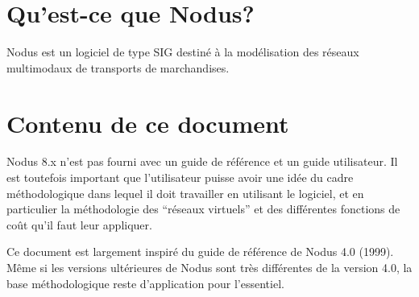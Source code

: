 
\section{Qu'est-ce que Nodus?}

Nodus est un logiciel de type SIG destiné à la modélisation des réseaux
multi\-modaux de transports de marchandises.

\section{Contenu de ce document}

Nodus 8.x n'est pas fourni avec un guide de référence et un guide
utilisateur.  Il est toutefois important que l'utilisateur puisse avoir une idée
du cadre méthodologique dans lequel il doit travailler en utilisant le logiciel,
et en particulier la méthodologie des ``réseaux virtuels'' et des différentes
fonctions de coût qu'il faut leur appliquer.

Ce document est largement inspiré du guide de référence de Nodus 4.0 (1999).
Même si les versions ultérieures de Nodus sont très différentes de la version
4.0, la base méthodologique reste d'application pour l'essentiel.

